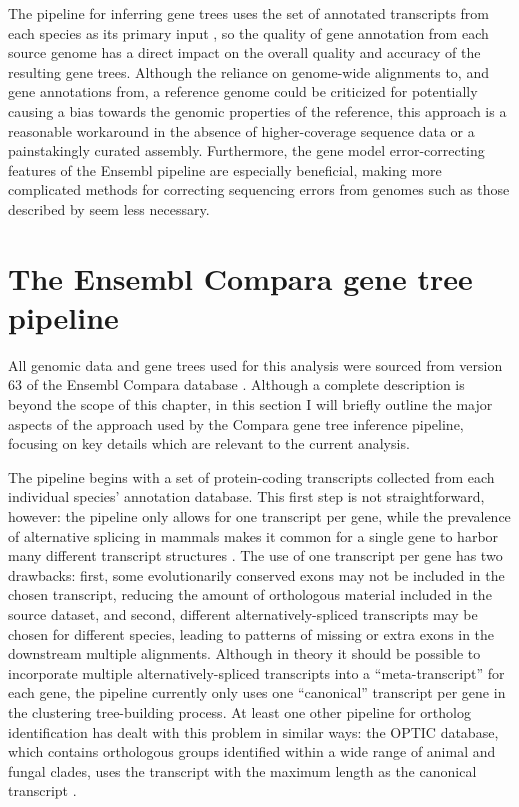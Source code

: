 The \cmp pipeline for inferring gene trees uses the set of annotated
transcripts from each species as its primary input
\citep{Vilella2009}, so the quality of gene annotation from each
source genome has a direct impact on the overall quality and accuracy
of the resulting gene trees. Although the reliance on genome-wide
alignments to, and gene annotations from, a reference genome could be
criticized for potentially causing a bias towards the genomic
properties of the reference, this approach is a reasonable workaround
in the absence of higher-coverage sequence data or a painstakingly
curated assembly. Furthermore, the gene model error-correcting
features of the Ensembl pipeline are especially beneficial, making
more complicated methods for correcting sequencing errors from \lcv
genomes such as those described by \citep{Hubisz2011} seem less
necessary.

\section{The Ensembl Compara gene tree pipeline}
\label{sec_compara_pipeline}

All genomic data and gene trees used for this analysis were sourced
from version 63 of the Ensembl Compara database
\citep{Vilella2009,Flicek2011}. Although a complete description is
beyond the scope of this chapter, in this section I will briefly
outline the major aspects of the approach used by the Compara gene
tree inference pipeline, focusing on key details which are relevant to
the current analysis.

The \cmp pipeline begins with a set of protein-coding transcripts
collected from each individual species' annotation database. This
first step is not straightforward, however: the \cmp pipeline only
allows for one transcript per gene, while the prevalence of
alternative splicing in \euth mammals makes it common for a single
gene to harbor many different transcript structures
\citep{Mironov1999}. The use of one transcript per gene has two
drawbacks: first, some evolutionarily conserved exons may not be
included in the chosen transcript, reducing the amount of orthologous
material included in the source dataset, and second, different
alternatively-spliced transcripts may be chosen for different species,
leading to patterns of missing or extra exons in the downstream
multiple alignments. Although in theory it should be possible to
incorporate multiple alternatively-spliced transcripts into a
``meta-transcript'' for each gene, the \cmp pipeline currently only
uses one ``canonical'' transcript per gene in the clustering
tree-building process. At least one other pipeline for ortholog
identification has dealt with this problem in similar ways: the OPTIC
database, which contains orthologous groups identified within a wide
range of animal and fungal clades, uses the transcript with the
maximum length as the canonical transcript \citep{Heger2008}.

